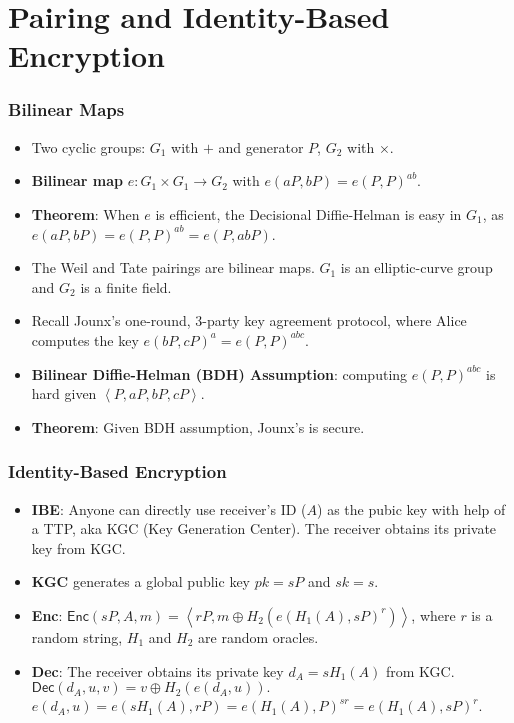 \section{Pairing and Identity-Based Encryption}
\begin{frame}\frametitle{Bilinear Maps}
\begin{itemize}
\item Two cyclic groups: $G_1$ with $+$ and generator $P$, $G_2$ with $\times$.
\item \textbf{Bilinear map} $e: G_1 \times G_1 \to G_2$ with $e(aP, bP)=e(P,P)^{ab}$. 
\item \textbf{Theorem}: When $e$ is efficient, the Decisional Diffie-Helman is easy in $G_1$, as $e(aP, bP) = e(P, P)^{ab} = e(P, abP)$.
\item The Weil and Tate pairings are bilinear maps. $G_1$ is an elliptic-curve group and $G_2$ is a finite field.
\item Recall Jounx's one-round, 3-party key agreement protocol, where
Alice computes the key $e(bP, cP)^a = e(P, P)^{abc}$.
\item \textbf{Bilinear Diffie-Helman (BDH) Assumption}: computing $e(P, P)^{abc}$ is hard given $\left<P, aP, bP, cP \right>$.
\item \textbf{Theorem}: Given BDH assumption, Jounx's is secure.
\end{itemize}
\end{frame}
\begin{frame}\frametitle{Identity-Based Encryption}
\begin{itemize}
\item \textbf{IBE}: Anyone can directly use receiver's ID ($A$) as the pubic key with help of a TTP, aka KGC (Key Generation Center). The receiver obtains its private key from KGC.
\item \textbf{KGC} generates a global public key $pk = sP$ and $sk = s$.
\item \textbf{Enc}: $\mathsf{Enc}(sP, A, m) = \left< rP, m\oplus H_2(e(H_1(A), sP)^r)\right>$, where $r$ is a random string, $H_1$ and $H_2$ are random oracles.
\item \textbf{Dec}: The receiver obtains its private key $d_{A} = sH_1(A)$ from KGC. 
 $\mathsf{Dec}(d_{A}, u, v) = v \oplus H_2(e(d_A, u)).$ \\
 $e(d_A, u) = e(sH_1(A), rP) = e(H_1(A), P)^{sr} = e(H_1(A), sP)^r$.
\end{itemize}
\end{frame}
